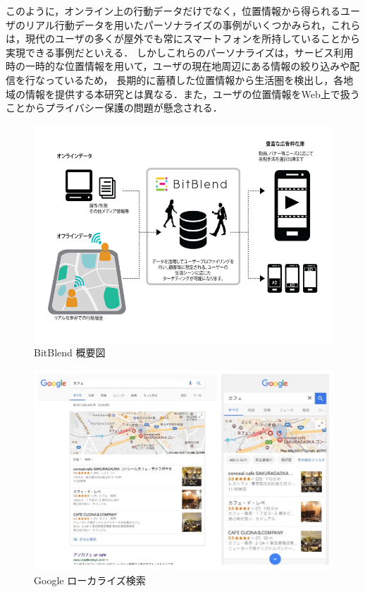 \documentclass[a4paper]{jsarticle}
\begin{document}

このように，オンライン上の行動データだけでなく，位置情報から得られるユーザのリアル行動データを用いたパーソナライズの事例がいくつかみられ，これらは，現代のユーザの多くが屋外でも常にスマートフォンを所持していることから実現できる事例だといえる．
しかしこれらのパーソナライズは，サービス利用時の一時的な位置情報を用いて，ユーザの現在地周辺にある情報の絞り込みや配信を行なっているため，
長期的に蓄積した位置情報から生活圏を検出し，各地域の情報を提供する本研究とは異なる．また，ユーザの位置情報をWeb上で扱うことからプライバシー保護の問題が懸念される．


\fifigure
\begin{figure}[H]
  \begin{center}
    \includegraphics[width=0.85\hsize]{./images/bitblend.png}
    \caption{BitBlend 概要図}
    \label{fig:bitblend}
  \end{center}
\end{figure}
\fi

\fifigure
\begin{figure}[H]
  \begin{center}
    \includegraphics[width=0.85\hsize]{./images/localize_search.jpg}
    \caption{Google ローカライズ検索}
    \label{fig:localize-search}
  \end{center}
\end{figure}
\fi
\end{document}
